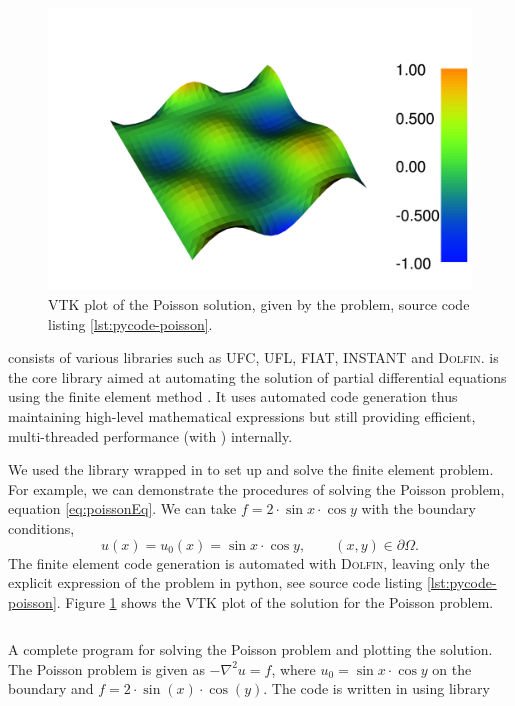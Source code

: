 	\begin{figure}[!h]
	\centering
	\includegraphics[width=0.5\linewidth]{./figures/eulerian/dolfin_plot_2-rotated270.png}
	\caption{\dolfin VTK plot of the Poisson solution, given by the problem, source code listing \ref{lst:pycode-poisson}.}
	\label{fig:dolfinExampleFigure}
	\end{figure}

\fenics consists of various libraries such as UFC, UFL, FIAT, INSTANT and \textsc{Dolfin}. \dolfin is the core library aimed at automating the solution of partial differential equations using the finite element method \cite{Logg2010a}. It uses automated code generation thus maintaining high-level mathematical expressions but still providing efficient, multi-threaded performance (with ) internally. %

We used the \dolfin library wrapped in \python to set up and solve the finite element problem. For example, we can demonstrate the procedures of solving the Poisson problem, equation \ref{eq:poissonEq}. We can take $f=2\cdot\sin{x}\cdot\cos{y}$ with the boundary conditions,
	\begin{equation}
	u(x) = u_0(x) = \sin x \cdot \cos y, \qquad (x,y) \in \partial\Omega.
	\end{equation}
The finite element code generation is automated with \textsc{Dolfin}, leaving only the explicit expression of the problem in python, see source code listing \ref{lst:pycode-poisson}. Figure \ref{fig:dolfinExampleFigure} shows the VTK plot of the solution for the Poisson problem.

	\begin{listing}[p]
	\inputminted[fontseries=courier,obeytabs,fontsize=\footnotesize,mathescape,linenos,numbersep=5pt,frame=lines,framesep=2mm,xleftmargin=20mm,xrightmargin=20mm]{python}{figures/eulerian/dolfinExample.py}
	\caption{A complete program for solving the Poisson problem and plotting the solution. The Poisson problem is given as $-\nabla^2{u} = f$, where $u_0 = \sin{x}\cdot\cos{y}$ on the boundary and $f=2\cdot\sin(x)\cdot\cos(y)$. The code is written in \python using  library}
	\label{lst:pycode-poisson}
	\end{listing}

